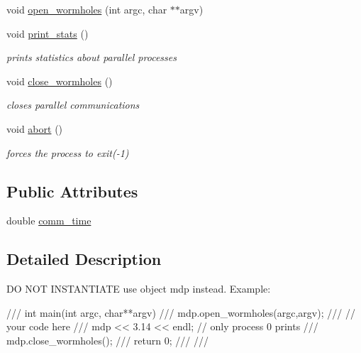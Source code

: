 \begin{DoxyCompactItemize}
void \hyperlink{classmdp__communicator_af2c43869a689b8f1d020d4c4995b0cee}{open\_\-wormholes} (int argc, char $\ast$$\ast$argv)
\item 
void \hyperlink{classmdp__communicator_a33ee55b0c67b1f63fd3a100e36fcc35e}{print\_\-stats} ()
\begin{DoxyCompactList}\small\item\em prints statistics about parallel processes \item\end{DoxyCompactList}\item 
void \hyperlink{classmdp__communicator_ad9941f7db0a5a447e37e8372b15f83f9}{close\_\-wormholes} ()
\begin{DoxyCompactList}\small\item\em closes parallel communications \item\end{DoxyCompactList}\item 
void \hyperlink{classmdp__communicator_aa601b7788f242a7f71b955a6bdf7e002}{abort} ()
\begin{DoxyCompactList}\small\item\em forces the process to exit(-\/1) \item\end{DoxyCompactList}\end{DoxyCompactItemize}
\subsection*{Public Attributes}
\begin{DoxyCompactItemize}
\item 
double \hyperlink{classmdp__communicator_a0292893d19938e48bac585bdff3d7831}{comm\_\-time}
\end{DoxyCompactItemize}


\subsection{Detailed Description}
DO NOT INSTANTIATE use object mdp instead. Example: \begin{DoxyVerb}
/// int main(int argc, char**argv) {
///    mdp.open_wormholes(argc,argv);
///    // your code here
///    mdp << 3.14 << endl;  // only process 0 prints
///    mdp.close_wormholes();
///    return 0;
/// }
/// \end{DoxyVerb}
 

